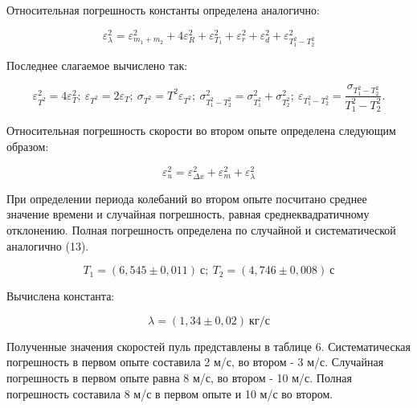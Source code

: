 \documentclass{article}
\begin{document}
Относительная погрешность константы определена аналогично:

\begin{equation}
	\varepsilon_{\lambda}^2 = \varepsilon_{m_1+m_2}^2 + 4\varepsilon_{R}^2 + \varepsilon_{T_1}^2 + \varepsilon_{r}^2 + \varepsilon_{d}^2 + \varepsilon_{T_1^2 - T_2^2}^2
\end{equation}

Последнее слагаемое вычислено так:

\begin{equation}
	\varepsilon_{T^2}^2 = 4 \varepsilon_{T}^2; \  \varepsilon_{T^2} = 2 \varepsilon_{T}; \
	\sigma_{T^2} = T^2 \varepsilon_{T^2}; \
	\sigma_{T_1^2 - T_2^2}^2 = \sigma_{T_1^2}^2 + \sigma_{T_2^2}^2; \
	\varepsilon_{T_1^2 - T_2^2} = \frac{\sigma_{T_1^2 - T_2^2}}{T_1^2 - T_2^2}.
\end{equation}

Относительная погрешность скорости во втором опыте определена следующим образом:

\begin{equation}
	\varepsilon_{u}^2 = \varepsilon_{\Delta x}^2 + \varepsilon_{m}^2 + \varepsilon_{\lambda}^2 
\end{equation}

При определении периода колебаний во втором опыте посчитано среднее значение времени и случайная погрешность, равная среднеквадратичному отклонению. Полная погрешность определена по случайной и систематической аналогично (13).
 
\begin{equation}
	T_1 = (6,545 \pm 0,011) \ с; \ T_2 = (4,746 \pm 0,008) \ с
\end{equation}

Вычислена константа:

\begin{equation}
	\lambda = (1,34 \pm 0,02) \ кг/с
\end{equation}

Полученные значения скоростей пуль представлены в таблице 6. Систематическая погрешность в первом опыте составила 2 м/с, во втором - 3 м/с. Случайная погрешность в первом опыте равна 8 м/с, во втором - 10 м/с. Полная погрешность составила 8 м/с в первом опыте и 10 м/с во втором.

\begin{table}[h!]
	\centering
\end{table}
\end{document}
